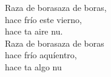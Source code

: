 \documentclass[12pt]{article}
\begin{document}
\begin{multicols*}{2}
\begin{cancion}
	\begin{chorus}%
	Raza de borasaza de boras, \\
	hace frío este vierno,\\
	hace ta aire nu.\\
	Raza de borasaza de boras \\
	hace frío aquíentro, \\
	hace ta algo nu\\
	\end{chorus}%
	\jump\\
	     \\
\end{cancion}%


\end{multicols*}
\end{document}
